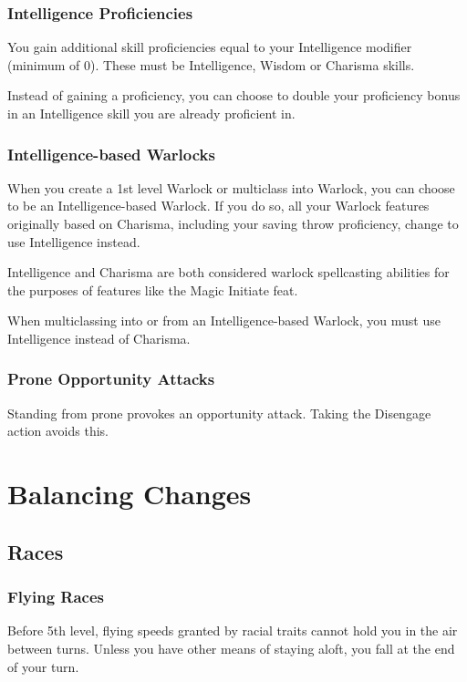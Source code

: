 \documentclass[letterpaper,twocolumn,openany,nodeprecatedcode]{dndbook}
\begin{document}
\subsection{Intelligence Proficiencies}
You gain additional skill proficiencies equal to your Intelligence modifier (minimum of 0). These must be Intelligence, Wisdom or Charisma skills. 

Instead of gaining a proficiency, you can choose to double your proficiency bonus in an Intelligence skill you are already proficient in.

\label{gameplay-warlock-int}
\subsection{Intelligence-based Warlocks}
When you create a 1st level Warlock or multiclass into Warlock, you can choose to be an Intelligence-based Warlock. If you do so, all your Warlock features originally based on Charisma, including your saving throw proficiency, change to use Intelligence instead.

Intelligence and Charisma are both considered warlock spellcasting abilities for the purposes of features like the Magic Initiate feat.

When multiclassing into or from an Intelligence-based Warlock, you must use Intelligence instead of Charisma.

\subsection{Prone Opportunity Attacks}
Standing from prone provokes an opportunity attack. Taking the Disengage action avoids this.









\chapter{Balancing Changes}

\label{balance-races}
\section{Races}
\label{balance-race-flying}
\subsection{Flying Races} Before 5th level, flying speeds granted by racial traits cannot hold you in the air between turns. Unless you have other means of staying aloft, you fall at the end of your turn.
\end{document}
